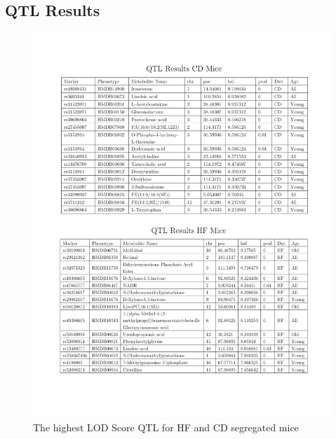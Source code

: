 \documentclass[a4paper]{book}
\begin{document}
\begin{subappendices}
\section{QTL Results}
\begin{figure}[tbh!]
	\centering
	\includegraphics[width=.9\linewidth]{3.Metabolomics/Metabolite_QTL_Tables}
	\caption{The highest LOD Score QTL for HF and CD segregated mice}
	\label{fig:Metabolite QTL Results Tables}
\end{figure}
\clearpage



\end{subappendices}
\end{document}
